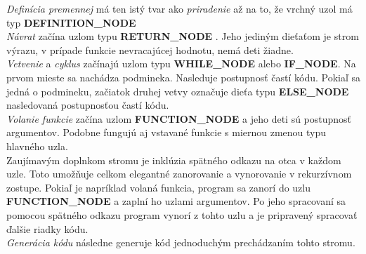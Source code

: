 \documentclass[Slovak, a4paper, 12pt]{article}
\begin{document}
	\textit{Definícia premennej} má ten istý tvar ako \textit{priradenie} až na to, že vrchný uzol má typ \textbf{DEFINITION\_NODE}\\[0.6em]
	\textit{Návrat} začína uzlom typu \textbf{RETURN\_NODE} . Jeho jediným dieťaťom je strom výrazu, v prípade funkcie nevracajúcej hodnotu, nemá deti žiadne.\\[0.6em]
	\textit{Vetvenie} a \textit{cyklus} začínajú uzlom typu \textbf{WHILE\_NODE} alebo \textbf{IF\_NODE}. Na prvom mieste sa nachádza podmineka.  Nasleduje postupnosť častí kódu. Pokiaľ sa jedná o podmineku, začiatok druhej vetvy označuje dieťa typu \textbf{ELSE\_NODE} nasledovaná postupnosťou častí kódu.\\[0.6em]
	\textit{Volanie funkcie} začína uzlom \textbf{FUNCTION\_NODE} a jeho deti sú postupnosť argumentov. Podobne fungujú aj vstavané funkcie s miernou zmenou 
	typu hlavného uzla.\\[0.6em]
	\noindent Zaujímavým doplnkom stromu je inklúzia spätného odkazu na otca v každom uzle. Toto umožňuje celkom elegantné zanorovanie a vynorovanie v 
	rekurzívnom zostupe. Pokiaľ je napríklad volaná funkcia, program sa zanorí do uzlu \textbf{FUNCTION\_NODE} a zaplní ho uzlami argumentov. Po jeho spracovaní sa pomocou spätného odkazu program vynorí z tohto uzlu a je pripravený spracovať ďalšie riadky kódu.\\[0.6em]
	\noindent \textit{Generácia kódu} následne generuje kód jednoduchým prechádzaním tohto stromu.
	
\end{document}

